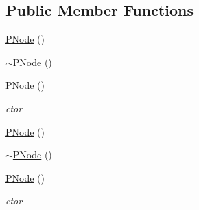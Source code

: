 \subsection*{Public Member Functions}
\begin{DoxyCompactItemize}
\item 
\hyperlink{structPNode_a705ca9a2a3088e1858a7e6b902e33cbc}{P\-Node} ()
\item 
\hyperlink{structPNode_ab2ebe390a68424694584fb9c64d1d681}{$\sim$\-P\-Node} ()
\item 
\hyperlink{structPNode_a705ca9a2a3088e1858a7e6b902e33cbc}{P\-Node} ()
\begin{DoxyCompactList}\small\item\em ctor \end{DoxyCompactList}\item 
\hyperlink{structPNode_a705ca9a2a3088e1858a7e6b902e33cbc}{P\-Node} ()
\item 
\hyperlink{structPNode_ab2ebe390a68424694584fb9c64d1d681}{$\sim$\-P\-Node} ()
\item 
\hyperlink{structPNode_a705ca9a2a3088e1858a7e6b902e33cbc}{P\-Node} ()
\begin{DoxyCompactList}\small\item\em ctor \end{DoxyCompactList}\end{DoxyCompactItemize}
